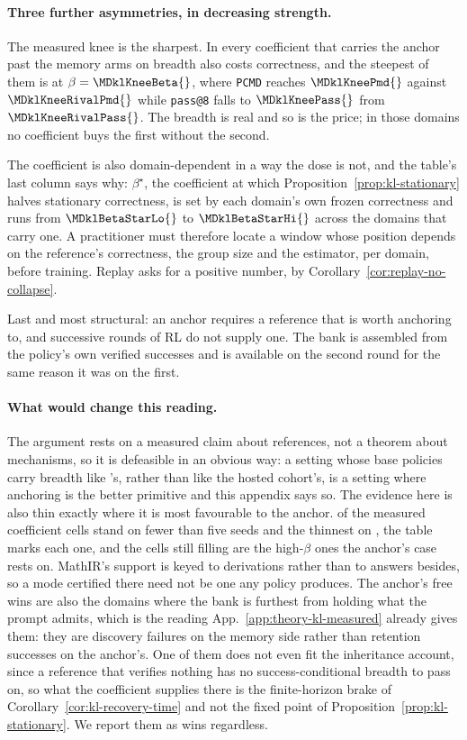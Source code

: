 \documentclass{article}
\newcommand{\1}{\mathbf 1}
\newcommand{\pmd}{\texttt{PCMD}}
\theoremstyle{remark}
\theoremstyle{definition}
\theoremstyle{plain}
\begin{document}
\paragraph{Three further asymmetries, in decreasing strength.}
The measured knee is the sharpest. In \MDklPricedNames{} every coefficient
that carries the anchor past the memory arms on breadth also costs correctness,
and the steepest of them is \MDklKneeDomain{} at $\beta=\MDklKneeBeta{}$, where
\pmd{} reaches $\MDklKneePmd{}$ against $\MDklKneeRivalPmd{}$ while
\texttt{pass@8} falls to $\MDklKneePass{}$ from $\MDklKneeRivalPass{}$. The
breadth is real and so is the price; in those domains no coefficient buys the
first without the second.

The coefficient is also domain-dependent in a way the dose is not, and the
table's last column says why: $\beta^\star$, the coefficient at which
Proposition~\ref{prop:kl-stationary} halves stationary correctness, is set by
each domain's own frozen correctness and runs from $\MDklBetaStarLo{}$ to
$\MDklBetaStarHi{}$ across the domains that carry one. A practitioner must therefore locate a window whose position
depends on the reference's correctness, the group size and the estimator, per
domain, before training. Replay asks for a positive
number, by Corollary~\ref{cor:replay-no-collapse}.

Last and most structural: an anchor requires a reference that is worth
anchoring to, and successive rounds of RL do not supply one. The bank is
assembled from the policy's own verified successes and is available on the
second round for the same reason it was on the first.

\paragraph{What would change this reading.}
The argument rests on a measured claim about references, not a theorem about
mechanisms, so it is defeasible in an obvious way: a setting whose base
policies carry breadth like \MDklWinDomain{}'s, rather than like the hosted
cohort's, is a setting where anchoring is the better primitive and this
appendix says so.
The evidence here is also thin exactly where it is most favourable to the
anchor. \MDklThinCells{} of the \MDklTotalCells{} measured coefficient cells
stand on fewer than five seeds and the thinnest on \MDklSeedsMin{}, the table
marks each one, and the cells still filling are the high-$\beta$ ones the
anchor's case rests on. MathIR's support is keyed to derivations rather than to
answers besides, so a mode certified there need not be one any policy produces.
The anchor's free wins are also the domains where the bank is furthest from
holding what the prompt admits, which is the reading
App.~\ref{app:theory-kl-measured} already gives them: they are discovery
failures on the memory side rather than retention successes on the anchor's.
One of them does not even fit the inheritance account, since a reference that
verifies nothing has no success-conditional breadth to pass on, so what the
coefficient supplies there is the finite-horizon brake of
Corollary~\ref{cor:kl-recovery-time} and not the fixed point of
Proposition~\ref{prop:kl-stationary}. We report them as wins regardless.
\end{document}
